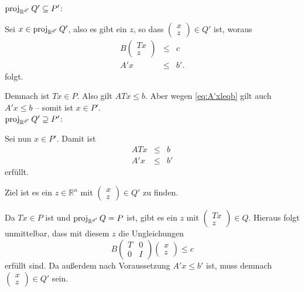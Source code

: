 \documentclass[10p,a4paper,BCOR = 12mm, DIV=15]{scrbook}
\begin{document}
{\begin{bew}
$\operatorname{proj}_{\mathbb{R}^{d'}} Q' \subseteq P'$: 

Sei $x \in \operatorname{proj}_{\mathbb{R}^{d'}} Q'$, also es gibt ein $z$, so dass $\left(\begin{array}{c}
x \\
z
\end{array}\right) \in Q'$ ist, woraus
\begin{eqnarray}
B \left(\begin{array}{c}
T x \\
z
\end{array}\right) & \leq & c \nonumber \\
A' x & \leq & b'. \label{eq:A'xleqb}
\end{eqnarray}
folgt.

Demnach ist $T x \in P$. Also gilt $A T x \leq b$. Aber wegen \eqref{eq:A'xleqb} gilt auch $A' x \leq b$ -- somit ist $x \in P'$. \\

$\operatorname{proj}_{\mathbb{R}^{d'}} Q' \supseteq P'$: 

Sei nun $x \in P'$.  Damit ist
\begin{eqnarray*}
A T x & \leq & b \\
A' x & \leq & b'
\end{eqnarray*}
erfüllt.

Ziel ist es ein $z \in \mathbb{R}^{n}$ mit $\left(\begin{array}{c}
x \\
z
\end{array}\right) \in Q'$ zu finden.

Da $T x \in P$ ist und $\operatorname{proj}_{\mathbb{R}^{d'}} Q = P$ ist, gibt es ein $z$ mit $\left(\begin{array}{c}
T x \\
z
\end{array}\right) \in Q$. Hieraus folgt unmittelbar, dass mit diesem $z$ die Ungleichungen
\begin{displaymath}
B \left(\begin{array}{cc}
T & 0 \\
0 & I
\end{array}\right) \left(\begin{array}{c}
x \\
z
\end{array}\right) \leq c
\end{displaymath}
erfüllt sind. Da außerdem nach Voraussetzung $A' x \leq b'$ ist, muss demnach $\left(\begin{array}{c}
x \\
z
\end{array}\right) \in Q'$ sein.
\end{bew}

}
\end{document}
